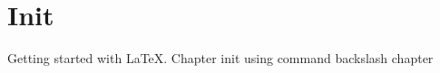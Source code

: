 \documentclass[10pt]{book}
\begin{document}
\chapter{Init}
Getting started with LaTeX. Chapter init using command backslash chapter
\end{document}
